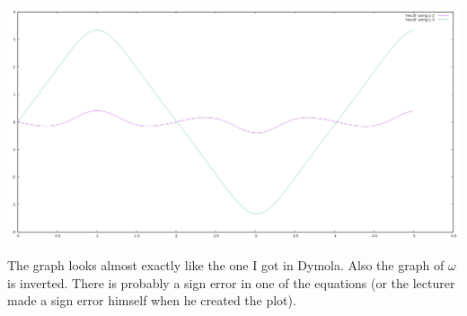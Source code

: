\documentclass[10pt,a4paper]{article}
\begin{document}
\includegraphics[width=450pt]{sheet-2/plot}

The graph looks almost exactly like the one I got in Dymola.
Also the graph of $\omega$ is inverted.
There is probably a sign error in one of the equations (or the lecturer made a sign error himself when he created the plot).
\end{document}
